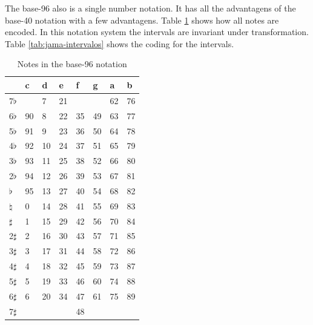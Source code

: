 \documentclass{article}
\begin{document}
The base-96 also is a single number notation. It has all the
advantagens of the base-40 notation with a few advantagens. Table
\ref{tab:jama-notas} shows how all notes are encoded. In this notation
system the intervals are invariant under transformation. Table
\ref{tab:jama-intervalos} shows the coding for the intervals.

\begin{table}
  \centering
  \begin{tabular}{l|lllllll}
               & c & d& e& f& g& a& b \\
    \hline
    7$\flat$   &   & 7&21&  &  &62&76 \\
    6$\flat$   & 90& 8&22&35&49&63&77 \\
    5$\flat$   & 91& 9&23&36&50&64&78 \\
    4$\flat$   & 92&10&24&37&51&65&79 \\
    3$\flat$   & 93&11&25&38&52&66&80 \\
    2$\flat$   & 94&12&26&39&53&67&81 \\
    $\flat$    & 95&13&27&40&54&68&82 \\
    $\natural$ &  0&14&28&41&55&69&83 \\
    $\sharp$   &  1&15&29&42&56&70&84 \\
    2$\sharp$  &  2&16&30&43&57&71&85 \\
    3$\sharp$  &  3&17&31&44&58&72&86 \\
    4$\sharp$  &  4&18&32&45&59&73&87 \\
    5$\sharp$  &  5&19&33&46&60&74&88 \\
    6$\sharp$  &  6&20&34&47&61&75&89 \\
    7$\sharp$  &   &  &  &48&  &  &   \\
  \end{tabular}
  \caption{Notes in the base-96 notation}
  \label{tab:jama-notas}
\end{table}
\end{document}

